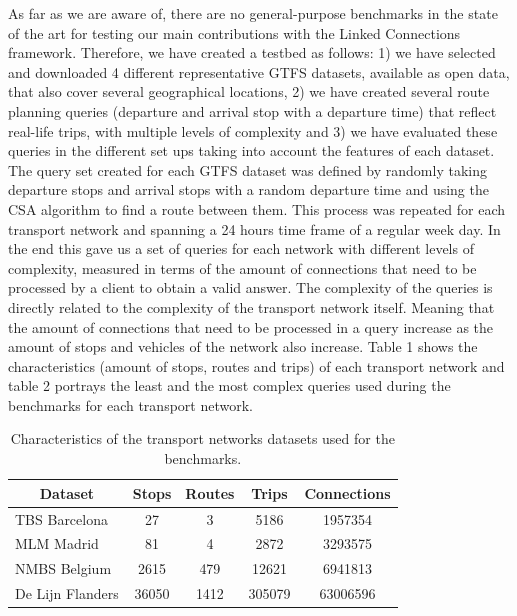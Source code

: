 \documentclass[sw]{iosart2x}
\begin{document}
	As far as we are aware of, there are no general-purpose benchmarks in the state of the art for testing our main contributions with the Linked Connections framework. Therefore, we have created a testbed as follows: 1) we have selected and downloaded 4 different representative GTFS datasets, available as open data, that also cover several geographical locations, 2) we have created several route planning queries (departure and arrival stop with a departure time) that reflect real-life trips, with multiple levels of complexity and 3) we have evaluated these queries in the different set ups taking into account the features of each dataset. The query set created for each GTFS dataset was defined by randomly taking departure stops and arrival stops with a random departure time and using the CSA algorithm to find a route between them. This process was repeated for each transport network and spanning a 24 hours time frame of a regular week day. In the end this gave us a set of queries for each network with different levels of complexity, measured in terms of the amount of connections that need to be processed by a client to obtain a valid answer. The complexity of the queries is directly related to the complexity of the transport network itself. Meaning that the amount of connections that need to be processed in a query increase as the amount of stops and vehicles of the network also increase. Table 1 shows the characteristics (amount of stops, routes and trips) of each transport network and table 2 portrays the least and the most complex queries used during the benchmarks for each transport network.
	
	\begin{table}
	\centering
	\label{tab:datasets}
	\begin{tabular}{l|c|c|c|c}
	\hline
	\multicolumn{1}{c|}{\textbf{Dataset}} & \multicolumn{1}{c|}{\textbf{Stops}} & \multicolumn{1}{c|}{\textbf{Routes}} & \multicolumn{1}{c|}{\textbf{Trips}} & \multicolumn{1}{c}{\textbf{Connections}} \\ \hline
	TBS Barcelona & 27 & 3 & 5186 & 1957354 \\ \hline
	MLM Madrid & 81 & 4 & 2872 & 3293575 \\ \hline
	NMBS Belgium & 2615 & 479 & 12621 & 6941813 \\ \hline
	De Lijn Flanders & 36050 & 1412 & 305079 & 63006596 \\ \hline
	
	\end{tabular}
	\caption{Characteristics of the transport networks datasets used for the benchmarks.} 
	\end{table}
	
\end{document}
